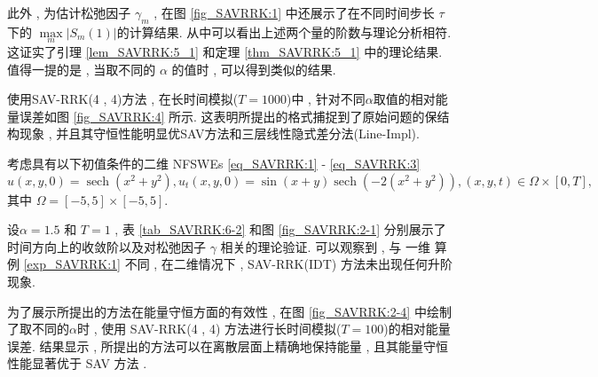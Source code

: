 		此外 , 为估计松弛因子 $\gamma_m$ , 在图 \ref{fig_SAVRRK:1} 中还展示了在不同时间步长 $\tau$下的 $\max\limits _m\left|S_m(1)\right|$的计算结果.
从中可以看出上述两个量的阶数与理论分析相符.这证实了引理 \ref{lem_SAVRRK:5_1} 和定理 \ref{thm_SAVRRK:5_1} 中的理论结果.
值得一提的是 , 当取不同的 $\alpha$ 的值时 , 可以得到类似的结果.%

		使用SAV-RRK(4 , 4)方法 , 在长时间模拟($T=1000$)中 , 针对不同$\alpha$取值的相对能量误差如图 \ref{fig_SAVRRK:4} 所示.
		这表明所提出的格式捕捉到了原始问题的保结构现象 , 并且其守恒性能明显优SAV方法\cite{chengConvergenceEnergyconservingScheme2022}和三层线性隐式差分法(Line-Impl)\cite{wangConservativeLinearizedDifference2015}.
		
	\begin{example}\label{exp_SAVRRK:2}
		考虑具有以下初值条件的二维 NFSWEs \eqref{eq_SAVRRK:1} - \eqref{eq_SAVRRK:3}
		\begin{equation*}
		u(x , y , 0)=\operatorname{sech}\left(x^2+y^2\right) , u_t(x , y , 0)=\sin (x+y) \operatorname{sech}\left(-2\left(x^2+y^2\right)\right) , (x , y , t) \in \Omega \times[0 , T] , 
		\end{equation*}
		其中 $\Omega=[-5 , 5] \times[-5 , 5]$.
		\end{example}
			
		设$\alpha=1.5$ 和 $T=1$ , 表 \ref{tab_SAVRRK:6-2} 和图 \ref{fig_SAVRRK:2-1} 分别展示了时间方向上的收敛阶以及对松弛因子 $\gamma$ 相关的理论验证.
		可以观察到 , 与 一维 算例 \ref{exp_SAVRRK:1} 不同 , 在二维情况下 , SAV-RRK(IDT) 方法未出现任何升阶现象.

		为了展示所提出的方法在能量守恒方面的有效性 , 在图 \ref{fig_SAVRRK:2-4} 中绘制了取不同的$\alpha$时 , 使用 SAV-RRK(4 , 4) 方法进行长时间模拟($T=100$)的相对能量误差.
结果显示 , 所提出的方法可以在离散层面上精确地保持能量 , 且其能量守恒性能显著优于 SAV 方法 \cite{chengConvergenceEnergyconservingScheme2022}.

